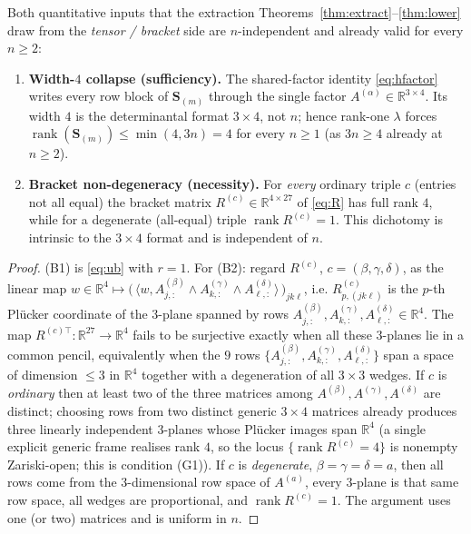 \begin{proposition}\label{prop:bracketside}
Both quantitative inputs that the extraction Theorems~\ref{thm:extract}--\ref{thm:lower}
draw from the \emph{tensor / bracket} side are $n$-independent and already valid for every
$n\ge2$:
\begin{enumerate}
\item[\textnormal{(B1)}] \textbf{Width-$4$ collapse (sufficiency).} The shared-factor
identity \eqref{eq:hfactor} writes every row block of $\mathbf S_{(m)}$ through the single
factor $A^{(\alpha)}\in\mathbb R^{3\times4}$. Its width $4$ is the determinantal format
$3\times4$, not $n$; hence rank-one $\lambda$ forces
$\operatorname{rank}(\mathbf S_{(m)})\le\min(4,3n)=4$ for every $n\ge1$ (as $3n\ge4$ already
at $n\ge2$).
\item[\textnormal{(B2)}] \textbf{Bracket non-degeneracy (necessity).} For \emph{every}
ordinary triple $c$ (entries not all equal) the bracket matrix $R^{(c)}\in\mathbb R^{4\times27}$
of \eqref{eq:R} has full rank $4$, while for a degenerate (all-equal) triple
$\operatorname{rank}R^{(c)}=1$. This dichotomy is intrinsic to the $3\times4$ format and is
independent of $n$.
\end{enumerate}
\end{proposition}

\begin{proof}
(B1) is \eqref{eq:ub} with $r=1$. For (B2): regard $R^{(c)}$, $c=(\beta,\gamma,\delta)$, as
the linear map $w\in\mathbb R^4\mapsto\big(\,\langle w,A^{(\beta)}_{j,:}\wedge A^{(\gamma)}_{k,:}
\wedge A^{(\delta)}_{\ell,:}\rangle\,\big)_{jk\ell}$, i.e. $R^{(c)}_{p,(jk\ell)}$ is the
$p$-th Plücker coordinate of the $3$-plane spanned by rows $A^{(\beta)}_{j,:},A^{(\gamma)}_{k,:},
A^{(\delta)}_{\ell,:}\in\mathbb R^4$. The map $R^{(c)\top}\colon\mathbb R^{27}\to\mathbb R^4$
fails to be surjective exactly when all these $3$-planes lie in a common pencil, equivalently
when the $9$ rows $\{A^{(\beta)}_{j,:},A^{(\gamma)}_{k,:},A^{(\delta)}_{\ell,:}\}$ span a space
of dimension $\le3$ in $\mathbb R^4$ together with a degeneration of all $3\times3$ wedges.
If $c$ is \emph{ordinary} then at least two of the three matrices among
$A^{(\beta)},A^{(\gamma)},A^{(\delta)}$ are distinct; choosing rows from two distinct generic
$3\times4$ matrices already produces three linearly independent $3$-planes whose Plücker
images span $\mathbb R^4$ (a single explicit generic frame realises rank $4$, so the locus
$\{\operatorname{rank}R^{(c)}=4\}$ is nonempty Zariski-open; this is condition (G1)). If $c$ is
\emph{degenerate}, $\beta=\gamma=\delta=a$, then all rows come from the $3$-dimensional row
space of $A^{(a)}$, every $3$-plane is that same row space, all wedges are proportional, and
$\operatorname{rank}R^{(c)}=1$. The argument uses one (or two) matrices and is uniform in $n$.
\end{proof}

